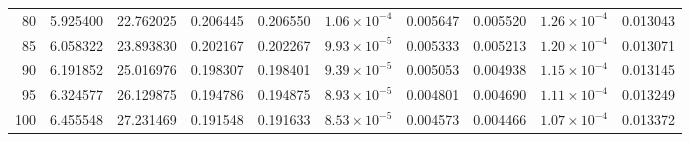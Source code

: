 \begin{tabular}{@{}rrrrrrrrrr@{}}
80 & 5.925400 & 22.762025 & 0.206445 & 0.206550 & $1.06\times10^{-4}$ & 0.005647 & 0.005520 & $1.26\times10^{-4}$ & 0.013043 \\
85 & 6.058322 & 23.893830 & 0.202167 & 0.202267 & $9.93\times10^{-5}$ & 0.005333 & 0.005213 & $1.20\times10^{-4}$ & 0.013071 \\
90 & 6.191852 & 25.016976 & 0.198307 & 0.198401 & $9.39\times10^{-5}$ & 0.005053 & 0.004938 & $1.15\times10^{-4}$ & 0.013145 \\
95 & 6.324577 & 26.129875 & 0.194786 & 0.194875 & $8.93\times10^{-5}$ & 0.004801 & 0.004690 & $1.11\times10^{-4}$ & 0.013249 \\
100 & 6.455548 & 27.231469 & 0.191548 & 0.191633 & $8.53\times10^{-5}$ & 0.004573 & 0.004466 & $1.07\times10^{-4}$ & 0.013372 \\
\hline
\end{tabular}

